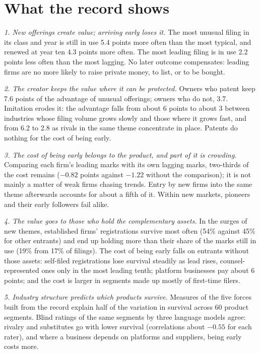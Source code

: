 \section*{What the record shows}

\emph{1. New offerings create value; arriving early loses it.} The most
unusual filing in its class and year is still in use 5.4 points more
often than the most typical, and renewed at year ten 4.3 points more
often. The most leading filing is in use 2.2 points less often than the
most lagging. No later outcome compensates: leading firms are no more
likely to raise private money, to list, or to be bought.

\emph{2. The creator keeps the value where it can be protected.} Owners
who patent keep 7.6 points of the advantage of unusual offerings; owners
who do not, 3.7. Imitation erodes it: the advantage falls from about 6
points to about 3 between industries whose filing volume grows slowly and
those where it grows fast, and from 6.2 to 2.8 as rivals in the same
theme concentrate in place. Patents do nothing for the cost of being
early.

\emph{3. The cost of being early belongs to the product, and part of it
is crowding.} Comparing each firm's leading marks with its own lagging
marks, two-thirds of the cost remains ($-0.82$ points against $-1.22$
without the comparison); it is not mainly a matter of weak firms chasing
trends. Entry by new firms into the same theme afterwards accounts for
about a fifth of it. Within new markets, pioneers and their early
followers fail alike.

\emph{4. The value goes to those who hold the complementary assets.} In
the surges of new themes, established firms' registrations survive most
often (54\% against 45\% for other entrants) and end up holding more than
their share of the marks still in use (19\% from 17\% of filings). The
cost of being early falls on entrants without those assets: self-filed
registrations lose survival steadily as lead rises, counsel-represented
ones only in the most leading tenth; platform businesses pay about 6
points; and the cost is larger in segments made up mostly of first-time
filers.

\emph{5. Industry structure predicts which products survive.} Measures of
the five forces \citep{Porter1980} built from the record explain half of
the variation in survival across 60 product segments. Blind ratings of
the same segments by three language models agree: rivalry and
substitutes go with lower survival (correlations about $-0.55$ for each
rater), and where a business depends on platforms and suppliers, being
early costs more.

